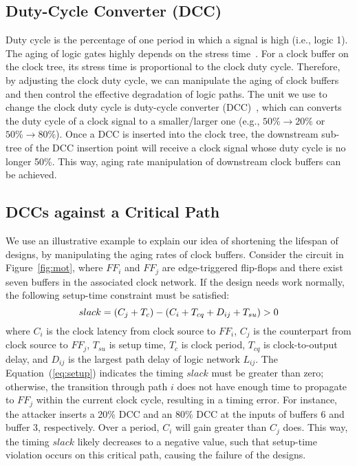 \subsection{Duty-Cycle Converter (DCC)}
Duty cycle is the percentage of one period in which a signal is high (i.e., logic 1). The aging of logic gates highly depends on the stress time~\cite{wang2010impact}. For a clock buffer on the clock tree, its stress time is proportional to the clock duty cycle. Therefore, by adjusting the clock duty cycle, we can manipulate the aging of clock buffers and then control the effective degradation of logic paths. The unit we use to change the clock duty cycle is duty-cycle converter (DCC)~\cite{wu2018maui}, which can converts the duty cycle of a clock signal to a smaller/larger one (e.g., $50\% \rightarrow 20\%$ or $50\% \rightarrow 80\%$). Once a DCC is inserted into the clock tree, the downstream sub-tree of the DCC insertion point will receive a clock signal whose duty cycle is no longer 50\%. This way, aging rate manipulation of downstream clock buffers can be achieved.
\subsection{DCCs against a Critical Path}
We use an illustrative example to explain our idea of shortening the lifespan of designs, by manipulating the aging rates of clock buffers. Consider the circuit in Figure~\ref{fig:mot}, where $FF_{i}$ and $FF_{j}$ are edge-triggered flip-flops and there exist seven buffers in the associated clock network. If the design needs work normally, the following setup-time constraint must be satisfied:
\begin{equation}
	\label{eq:setup}
	\fontsize{8}{9} \selectfont
	slack = (C_{j} + T_{c}) - (C_{i}  + T_{cq} + D_{ij} + T_{su}) > 0 
\end{equation}
where $C_{i}$ is the clock latency from clock source to $FF_{i}$, $C_{j}$ is the counterpart from clock source to $FF_{j}$, $T_{su}$ is setup time, $T_{c}$ is clock period, $T_{cq}$ is clock-to-output delay, and $D_{ij}$ is the largest path delay of logic network $L_{ij}$. The Equation~(\ref{eq:setup}) indicates the timing $slack$ must be greater than zero; otherwise, the transition through path $i$ does not have enough time to propagate to $FF_{j}$ within the current clock cycle, resulting in a timing error. For instance, the attacker inserts a 20\% DCC and an 80\% DCC at the inputs of buffers 6 and buffer 3, respectively. Over a period, $C_{i}$ will gain greater than $C_{j}$ does. This way, the timing $slack$ likely decreases to a negative value, such that setup-time violation occurs on this critical path, causing the failure of the designs.